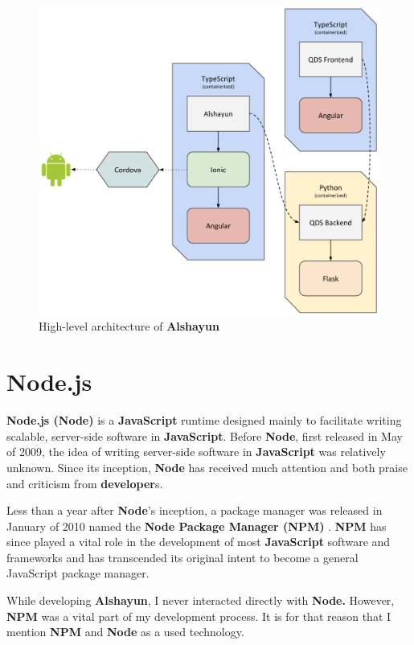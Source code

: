 \documentclass[12pt]{report}
\begin{document}
\begin{figure}
    \centering
    \includegraphics[scale=0.4]{images/arch.png}
    \caption{High-level architecture of \textbf{Alshayun}}
    \label{fig:arch}
\end{figure}

    \section{Node.js}

\textbf{Node\@.js (Node)} \cite{nodejs} is a \textbf{JavaScript} runtime
designed mainly to facilitate writing scalable, server-side software in
\textbf{JavaScript}. Before \textbf{Node}, first released in May of 2009, the
idea of writing server-side software in \textbf{JavaScript} was relatively
unknown. Since its inception, \textbf{Node} has received much attention and both
praise and criticism from \textbf{developer}s.

Less than a year after \textbf{Node}'s inception, a package manager was released
in January of 2010 named the \textbf{Node Package Manager (NPM)} \cite{npm}.
\textbf{NPM} has since played a vital role in the development of most
\textbf{JavaScript} software and frameworks and has transcended its original
intent to become a general JavaScript package manager.

While developing \textbf{Alshayun}, I never interacted directly with
\textbf{Node.} However, \textbf{NPM} was a vital part of my development process.
It is for that reason that I mention \textbf{NPM} and \textbf{Node} as a used
technology.
\end{document}
